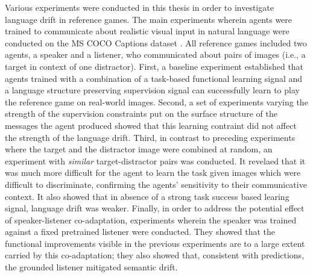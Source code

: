 Various experiments were conducted in this thesis in order to investigate language drift in reference games. The main experiments wherein agents were trained to communicate about realistic visual input in natural language were conducted on the MS COCO Captions dataset \parencite{chen2015microsoft}. All reference games included two agents, a speaker and a listener, who communicated about pairs of images (i.e., a target in context of one distractor).
First, a baseline experiment established that agents trained with a combination of a task-based functional learning signal and a language structure preserving supervision signal can successfully learn to play the reference game on real-world images. Second, a set of experiments varying the strength of the supervision constraints put on the surface structure of the messages the agent produced showed that this learning contraint did not affect the strength of the language drift. Third, in contrast to preceding experiments where the target and the distractor image were combined at random, an experiment with \emph{similar} target-distractor pairs was conducted. It revelaed that it was much more difficult for the agent to learn the task given images which were difficult to discriminate, confirming the agents' sensitivity to their communicative context. It also showed that in absence of a strong task success based learing signal, language drift was weaker. Finally, in order to address the potential effect of speaker-listener co-adaptation, experiments wherein the speaker was trained against a fixed pretrained listener were conducted. They showed that the functional improvements visible in the previous experiments are to a large extent carried by this co-adaptation; they also showed that, consistent with predictions, the grounded listener mitigated semantic drift.

